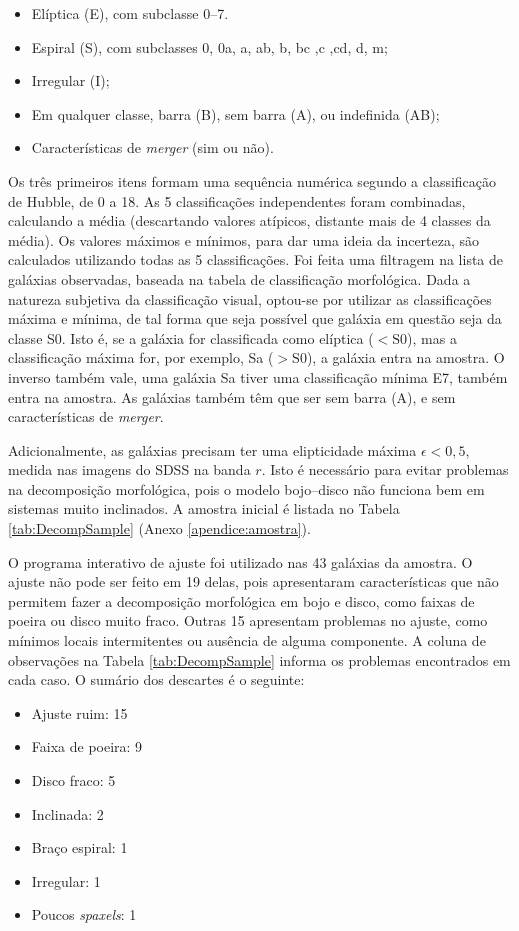 \begin{itemize}
  \item Elíptica (E), com subclasse 0--7.
  \item Espiral (S), com subclasses 0, 0a, a, ab, b, bc ,c ,cd, d, m;
  \item Irregular (I);
  \item Em qualquer classe, barra (B), sem barra (A), ou indefinida (AB);
  \item Características de {\em merger} (sim ou não).
\end{itemize}

Os três primeiros itens formam uma sequência numérica segundo a classificação de
Hubble, de 0 a 18. As 5 classificações independentes foram combinadas,
calculando a média (descartando valores atípicos, distante mais de 4 classes da
média). Os valores máximos e mínimos, para dar uma ideia da incerteza, são
calculados utilizando todas as 5 classificações. Foi feita uma filtragem na
lista de galáxias observadas, baseada na tabela de classificação morfológica.
Dada a natureza subjetiva da classificação visual, optou-se por utilizar as
classificações máxima e mínima, de tal forma que seja possível que galáxia em
questão seja da classe S0. Isto é, se a galáxia for classificada como elíptica
($<\mathrm{S0}$), mas a classificação máxima for, por exemplo, Sa
($>\mathrm{S0}$), a galáxia entra na amostra. O inverso também vale, uma galáxia
Sa tiver uma classificação mínima E7, também entra na amostra.
As galáxias também têm que ser sem barra (A), e sem características de {\em
merger}.

Adicionalmente, as galáxias precisam ter uma elipticidade máxima $\epsilon<0,5$,
medida nas imagens do SDSS na banda $r$. Isto é necessário para evitar problemas
na decomposição morfológica, pois o modelo bojo--disco não funciona bem em
sistemas muito inclinados. A amostra inicial é listada no Tabela
\ref{tab:DecompSample} (Anexo \ref{apendice:amostra}).

O programa interativo de ajuste foi utilizado nas 43 galáxias da amostra.
O ajuste não pode ser feito em 19 delas, pois apresentaram características que
não permitem fazer a decomposição morfológica em bojo e disco, como faixas de
poeira ou disco muito fraco. Outras 15 apresentam problemas no ajuste, como
mínimos locais intermitentes ou ausência de alguma componente. A coluna de
observações na Tabela \ref{tab:DecompSample} informa os problemas encontrados em
cada caso. O sumário dos descartes é o seguinte:

\begin{itemize}
  \item Ajuste ruim: 15
  \item Faixa de poeira: 9
  \item Disco fraco: 5
  \item Inclinada: 2
  \item Braço espiral: 1
  \item Irregular: 1
  \item Poucos {\em spaxels}: 1
\end{itemize}

